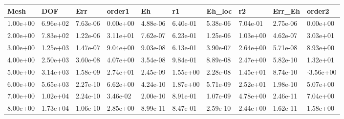 \begin{tabular}{llllllllll}
Mesh & DOF & Err & order1 & Eh & r1 & Eh_loc & r2 & Err_Eh & order2 \\ 
\hline 
1.00e+00 & 6.96e+02 & 7.63e-06 & 0.00e+00 & 4.88e-06 & 6.40e-01 & 5.38e-06 & 7.04e-01 & 2.75e-06 &  0.00e+00 \\ 
2.00e+00 & 7.83e+02 & 1.22e-06 & 3.11e+01 & 7.62e-07 & 6.23e-01 & 1.25e-06 & 1.03e+00 & 4.62e-07 &  3.03e+01 \\ 
3.00e+00 & 1.25e+03 & 1.47e-07 & 9.04e+00 & 9.03e-08 & 6.13e-01 & 3.90e-07 & 2.64e+00 & 5.71e-08 &  8.93e+00 \\ 
4.00e+00 & 2.50e+03 & 3.60e-08 & 4.07e+00 & 3.54e-08 & 9.84e-01 & 8.89e-08 & 2.47e+00 & 5.82e-10 &  1.32e+01 \\ 
5.00e+00 & 3.14e+03 & 1.58e-09 & 2.74e+01 & 2.45e-09 & 1.55e+00 & 2.28e-08 & 1.45e+01 & 8.74e-10 & -3.56e+00 \\ 
6.00e+00 & 5.65e+03 & 2.27e-10 & 6.62e+00 & 4.24e-10 & 1.87e+00 & 5.71e-09 & 2.52e+01 & 1.98e-10 &  5.07e+00 \\ 
7.00e+00 & 1.02e+04 & 2.24e-10 & 3.46e-02 & 2.00e-10 & 8.91e-01 & 1.07e-09 & 4.78e+00 & 2.46e-11 &  7.04e+00 \\ 
8.00e+00 & 1.73e+04 & 1.06e-10 & 2.85e+00 & 8.99e-11 & 8.47e-01 & 2.59e-10 & 2.44e+00 & 1.62e-11 &  1.58e+00 \\ 
\hline 
\end{tabular}